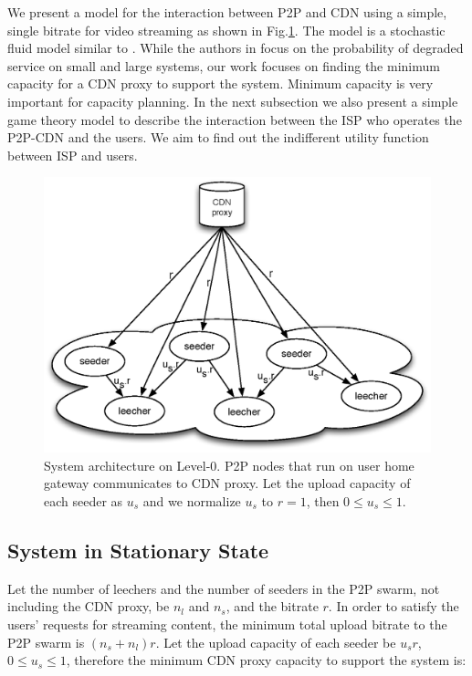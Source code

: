 \documentclass[paper]{ieice}
\begin{document}
We present a model for the interaction between P2P and CDN using a
simple, single bitrate for video streaming as shown in
Fig.\ref{fig:twotier2}.  The model is a stochastic fluid model similar
to \cite{4215694}.  While the authors in \cite{4215694} focus on the
probability of degraded service on small and large systems, our work
focuses on finding the minimum capacity for a CDN proxy to support the
system.  Minimum capacity is very important for capacity planning.  In
the next subsection we also present a simple game theory model to
describe the interaction between the ISP who operates the P2P-CDN and
the users.  We aim to find out the indifferent utility function
between ISP and users.

\begin{figure}[tb] 
\begin{center}
\includegraphics[scale=0.45]{graphs/two-tier-cdn-topology-2.eps}
\end{center}
\caption{System architecture on Level-0. P2P nodes that run on user home gateway communicates to CDN proxy.
Let the upload capacity of each seeder as $u_s$ and we normalize $u_s$ to $r=1$, then  $0 \leq u_s \leq 1$.}
\label{fig:twotier2}
\vspace{-2mm}
\end{figure}

\subsection{System in Stationary State}

Let the number of leechers and the number of seeders in the P2P swarm, not including the CDN proxy, be $n_l$ and $n_s$, and the bitrate $r$.
In order to satisfy the users' requests for streaming content, the minimum total upload bitrate to the P2P swarm is $(n_s + n_l)r$.  
Let the upload capacity of each seeder be $u_s r$, $0 \leq u_s \leq 1$, therefore the minimum CDN proxy capacity to support the system is:
\end{document}
